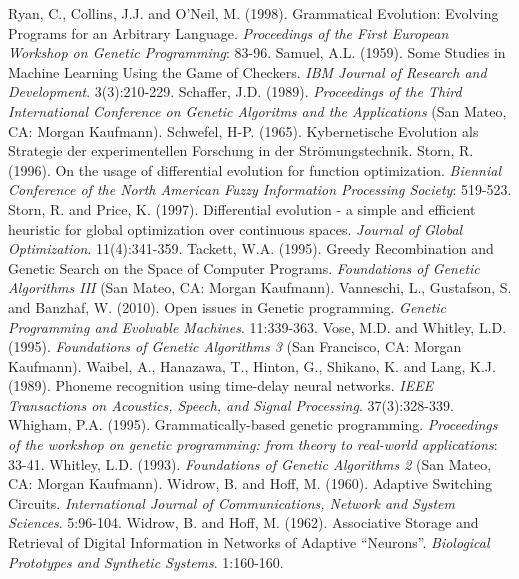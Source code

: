 \documentclass[spanish,a4paper,12pt,twoside]{report}
\begin{document}
\begin{thebibliography}{00}
   Ryan, C., Collins, J.J. and O'Neil, M. (1998). Grammatical Evolution: Evolving Programs for an Arbitrary Language. \emph{Proceedings of the First European Workshop on Genetic Programming}: 83-96.
   Samuel, A.L. (1959). Some Studies in Machine Learning Using the Game of Checkers. \emph{IBM Journal of Research and Development}. 3(3):210-229.
   Schaffer, J.D. (1989). \emph{Proceedings of the Third International Conference on Genetic Algoritms and the Applications} (San Mateo, CA: Morgan Kaufmann).
   Schwefel, H-P. (1965). Kybernetische Evolution als Strategie der experimentellen Forschung in der Strömungstechnik.
   Storn, R. (1996). On the usage of differential evolution for function optimization. \emph{Biennial Conference of the North American Fuzzy Information Processing Society}: 519-523.
   Storn, R. and Price, K. (1997). Differential evolution - a simple and efficient heuristic for global optimization over continuous spaces. \emph{Journal of Global Optimization}. 11(4):341-359.
   Tackett, W.A. (1995). Greedy Recombination and Genetic Search on the Space of Computer Programs. \emph{Foundations of Genetic Algorithms III} (San Mateo, CA: Morgan Kaufmann).
   Vanneschi, L., Gustafson, S. and Banzhaf, W. (2010). Open issues in Genetic programming. \emph{Genetic Programming and Evolvable Machines}. 11:339-363.
   Vose, M.D. and Whitley, L.D. (1995). \emph{Foundations of Genetic Algorithms 3} (San Francisco, CA: Morgan Kaufmann).
   Waibel, A., Hanazawa, T., Hinton, G., Shikano, K. and Lang, K.J. (1989). Phoneme recognition using time-delay neural networks. \emph{IEEE Transactions on Acoustics, Speech, and Signal Processing}. 37(3):328-339.
   Whigham, P.A. (1995). Grammatically-based genetic programming. \emph{Proceedings of the workshop on genetic programming: from theory to real-world applications}: 33-41.
   Whitley, L.D. (1993). \emph{Foundations of Genetic Algorithms 2} (San Mateo, CA: Morgan Kaufmann).
   Widrow, B. and Hoff, M. (1960). Adaptive Switching Circuits. \emph{International Journal of Communications, Network and System Sciences}. 5:96-104.
   Widrow, B. and Hoff, M. (1962). Associative Storage and Retrieval of Digital Information in Networks of Adaptive “Neurons”. \emph{Biological Prototypes and Synthetic Systems}. 1:160-160.
  \end{thebibliography}
  
\end{document}
